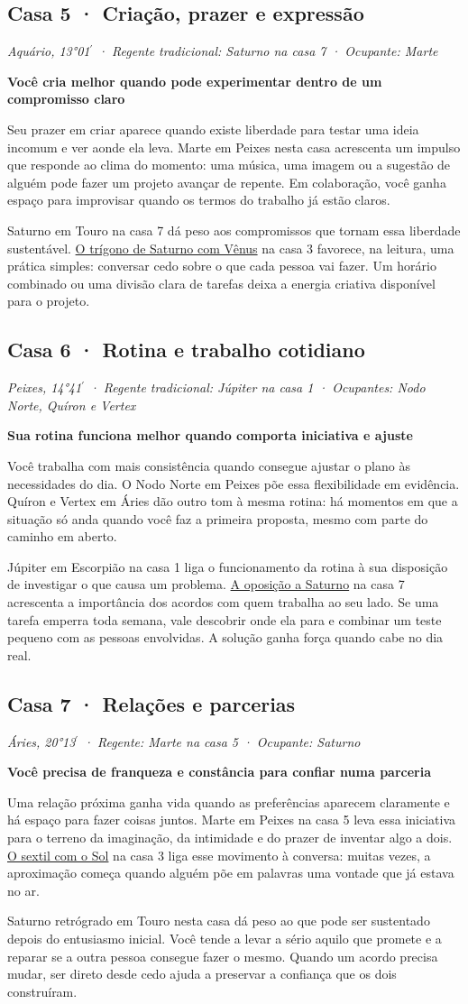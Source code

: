 \documentclass[11pt,a4paper]{article}
\newcommand{\leitura}[3]{\subsection{#1}\textit{#2}\par #3}
\newcommand{\subtituloleitura}[1]{\textbf{#1}\par\nopagebreak[4]}
\newcommand{\aspectoref}[2]{\hyperref[#1]{#2}}
\begin{document}
\leitura{Casa 5 · Criação, prazer e expressão}{Aquário, 13°01\ensuremath{^{\prime}} · Regente tradicional: Saturno na casa 7 · Ocupante: Marte}{
\subtituloleitura{Você cria melhor quando pode experimentar dentro de um compromisso claro}
Seu prazer em criar aparece quando existe liberdade para testar uma ideia incomum e ver aonde ela leva. Marte em Peixes nesta casa acrescenta um impulso que responde ao clima do momento: uma música, uma imagem ou a sugestão de alguém pode fazer um projeto avançar de repente. Em colaboração, você ganha espaço para improvisar quando os termos do trabalho já estão claros.

Saturno em Touro na casa 7 dá peso aos compromissos que tornam essa liberdade sustentável. \aspectoref{aspecto:venus-saturno}{O trígono de Saturno com Vênus} na casa 3 favorece, na leitura, uma prática simples: conversar cedo sobre o que cada pessoa vai fazer. Um horário combinado ou uma divisão clara de tarefas deixa a energia criativa disponível para o projeto.
}

\leitura{Casa 6 · Rotina e trabalho cotidiano}{Peixes, 14°41\ensuremath{^{\prime}} · Regente tradicional: Júpiter na casa 1 · Ocupantes: Nodo Norte, Quíron e Vertex}{
\subtituloleitura{Sua rotina funciona melhor quando comporta iniciativa e ajuste}
Você trabalha com mais consistência quando consegue ajustar o plano às necessidades do dia. O Nodo Norte em Peixes põe essa flexibilidade em evidência. Quíron e Vertex em Áries dão outro tom à mesma rotina: há momentos em que a situação só anda quando você faz a primeira proposta, mesmo com parte do caminho em aberto.

Júpiter em Escorpião na casa 1 liga o funcionamento da rotina à sua disposição de investigar o que causa um problema. \aspectoref{aspecto:jupiter-saturno}{A oposição a Saturno} na casa 7 acrescenta a importância dos acordos com quem trabalha ao seu lado. Se uma tarefa emperra toda semana, vale descobrir onde ela para e combinar um teste pequeno com as pessoas envolvidas. A solução ganha força quando cabe no dia real.
}

\leitura{Casa 7 · Relações e parcerias}{Áries, 20°13\ensuremath{^{\prime}} · Regente: Marte na casa 5 · Ocupante: Saturno}{
\subtituloleitura{Você precisa de franqueza e constância para confiar numa parceria}
Uma relação próxima ganha vida quando as preferências aparecem claramente e há espaço para fazer coisas juntos. Marte em Peixes na casa 5 leva essa iniciativa para o terreno da imaginação, da intimidade e do prazer de inventar algo a dois. \aspectoref{aspecto:sol-marte}{O sextil com o Sol} na casa 3 liga esse movimento à conversa: muitas vezes, a aproximação começa quando alguém põe em palavras uma vontade que já estava no ar.

Saturno retrógrado em Touro nesta casa dá peso ao que pode ser sustentado depois do entusiasmo inicial. Você tende a levar a sério aquilo que promete e a reparar se a outra pessoa consegue fazer o mesmo. Quando um acordo precisa mudar, ser direto desde cedo ajuda a preservar a confiança que os dois construíram.
}
\end{document}
